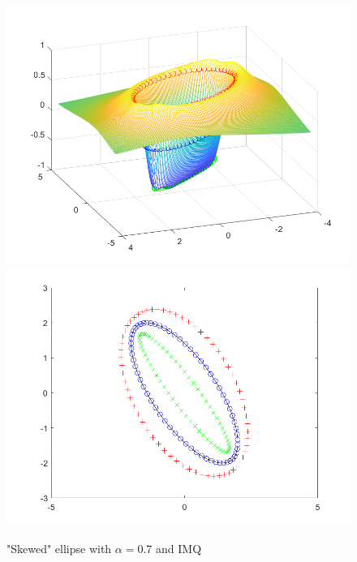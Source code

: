 \documentclass{article}
\begin{document}
\begin{figure}[h!]
    \includegraphics[scale = 0.3]{skewedEllipseSurf.png}
    \includegraphics[scale = 0.3]{skewedEllipseCurve.png}
    \centering
    \caption{"Skewed" ellipse with $\alpha = 0.7$ and IMQ}
\end{figure}
\end{document}
